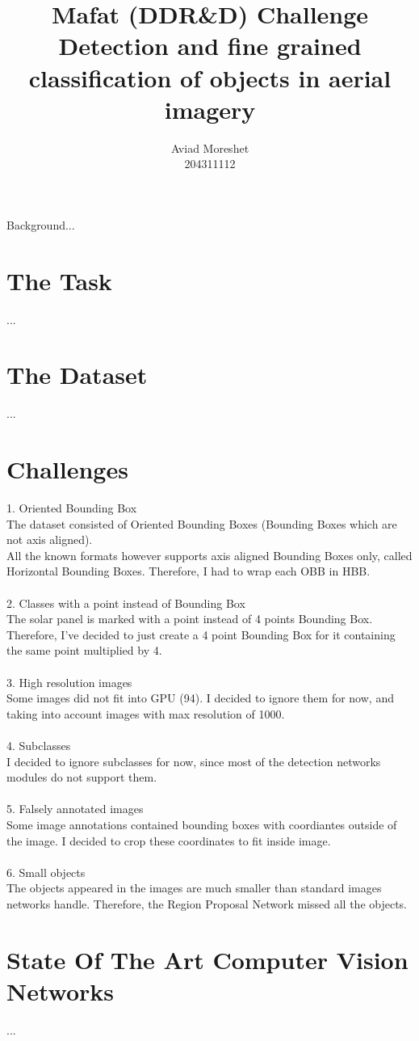 \documentclass[]{article}
\title{Mafat (DDR\&D) Challenge\\
	Detection and fine grained classification of objects in aerial imagery
	}
\author{Aviad Moreshet\\204311112}
\begin{document}
\date{}
\maketitle

\begin{b}
Background...
\end{b}

\section{The Task}
...

\section{The Dataset}
...

\section{Challenges}
1. Oriented Bounding Box \\
The dataset consisted of Oriented Bounding Boxes (Bounding Boxes which are not axis aligned). \\
All the known formats however supports axis aligned Bounding Boxes only, called Horizontal Bounding Boxes. 
Therefore, I had to wrap each OBB in HBB.
\\\\
2. Classes with a point instead of Bounding Box\\
The solar panel is marked with a point instead of 4 points Bounding Box. Therefore, I've decided to just create a 4 point Bounding Box for it containing the same point multiplied by 4.
\\\\
3. High resolution images\\
Some images did not fit into GPU (94). I decided to ignore them for now, and taking into account images with max resolution of 1000.
\\\\
4. Subclasses\\
I decided to ignore subclasses for now, since most of the detection networks modules do not support them.
\\\\
5. Falsely annotated images\\
Some image annotations contained bounding boxes with coordiantes outside of the image. I decided to crop these coordinates to fit inside image.
\\\\
6. Small objects\\
The objects appeared in the images are much smaller than standard images networks handle. Therefore, the Region Proposal Network missed all the objects.
\section{State Of The Art Computer Vision Networks}
...
\end{document}
